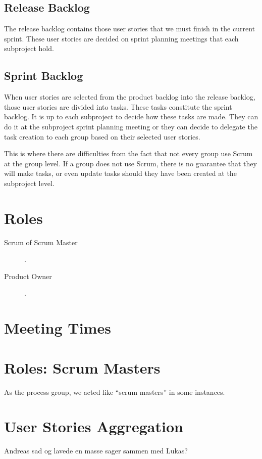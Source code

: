 \subsection{Release Backlog}
The release backlog contains those user stories that we must finish in the current sprint. These user stories are decided on sprint planning meetings that each subproject hold.

\subsection{Sprint Backlog}
When user stories are selected from the product backlog into the release backlog, those user stories are divided into tasks. These tasks constitute the sprint backlog. It is up to each subproject to decide how these tasks are made. They can do it at the subproject sprint planning meeting or they can decide to delegate the task creation to each group based on their selected user stories.

This is where there are difficulties from the fact that not every group use Scrum at the group level. If a group does not use Scrum, there is no guarantee that they will make tasks, or even update tasks should they have been created at the subproject level.

\section{Roles}

\begin{description}
  \item[Scrum of Scrum Master] \dummy.
  \item[Product Owner] \dummy.
\end{description}

\section{Meeting Times}
\dummy

\section{Roles: Scrum Masters}
As the process group, we acted like ``scrum masters'' in some instances.

\section{User Stories Aggregation}
Andreas sad og lavede en masse sager sammen med Lukas?

